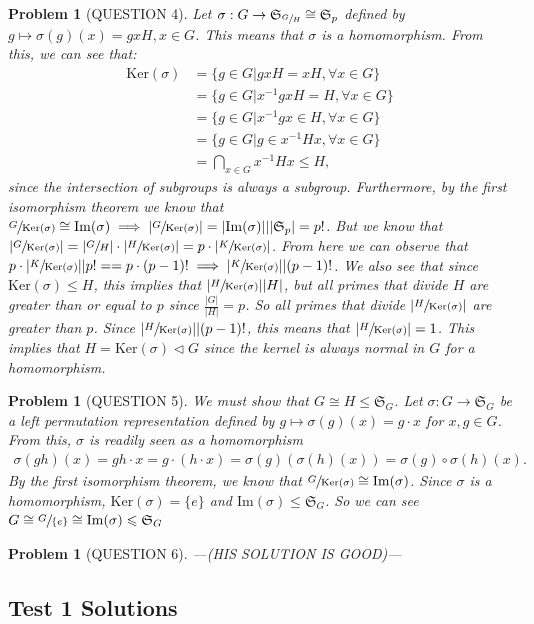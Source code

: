 \documentclass[titlepage]{article}
\theoremstyle{plain}
\newtheorem{problem}[theorem]{Problem}
\theoremstyle{definition}
\theoremstyle{remark}
\theoremstyle{exercise-style}
\numberwithin{equation}{section}
\numberwithin{theorem}{section}
\numberwithin{remark}{section}
\begin{document}
\begin{problem}[QUESTION 4]
    Let $\sigma : G \to \mathfrak{S}_{\sfrac{G}{H}} \cong \mathfrak{S}_p$ defined by $g \mapsto \sigma(g)(x) = gxH, x\in G$. This means that $\sigma$ is a homomorphism. From this, we can see that:
    \begin{align}
        \mathrm{Ker}(\sigma) &= \{ g \in G | gxH = xH, \forall x \in G \} \\
        &= \{ g \in G | x^{-1}gxH = H, \forall x \in G \} \\
        &= \{ g \in G | x^{-1}gx \in H, \forall x \in G \} \\
        &= \{ g \in G | g \in x^{-1}Hx, \forall x \in G \} \\
        &= \bigcap_{x \in G} x^{-1}H x \leqslant H,
    \end{align}
    since the intersection of subgroups is always a subgroup. Furthermore, by the first isomorphism theorem we know that $\sfrac{G}{\mathrm{Ker}(\sigma)} \cong \mathrm{Im}(\sigma) \implies |\sfrac{G}{\mathrm{Ker}(\sigma)}| = |\mathrm{Im}(\sigma)|||\mathfrak S_{p}| = p!$. But we know that $|\sfrac{G}{\mathrm{Ker}(\sigma)}|= |\sfrac{G}{H}|\cdot |\sfrac{H}{\mathrm{Ker}(\sigma)}| = p \cdot |\sfrac{K}{\mathrm{Ker}(\sigma)}|$. From here we can observe that $p \cdot |\sfrac{K}{\mathrm{Ker}(\sigma)}||p! == p \cdot (p-1)! \implies |\sfrac{K}{\mathrm{Ker}(\sigma)}| | (p-1)!$. We also see that since $\mathrm{Ker}(\sigma) \leqslant H$, this implies that $|\sfrac{H}{\mathrm{Ker}(\sigma)}||H|$, but all primes that divide $H$ are greater than or equal to $p$ since $\frac{|G|}{|H|}= p$. So all primes that divide $|\sfrac{H}{\mathrm{Ker}(\sigma)}|$ are greater than $p$. Since $|\sfrac{H}{\mathrm{Ker}(\sigma)}||(p-1)!$, this means that $|\sfrac{H}{\mathrm{Ker}(\sigma)}|=1$. This implies that $H = \mathrm{Ker}(\sigma) \triangleleft G$ since the kernel is always normal in $G$ for a homomorphism.
\end{problem}

\begin{problem}[QUESTION 5]
    We must show that $G \cong H \leqslant \mathfrak{S}_G$. Let $\sigma : G \to \mathfrak{S}_G$ be a left permutation representation defined by $g \mapsto \sigma(g)(x) = g \cdot x$ for $x, g \in G$. From this, $\sigma$ is readily seen as a homomorphism
    \begin{align}
        \sigma(gh)(x) = gh \cdot x = g \cdot (h \cdot x) = \sigma(g)(\sigma(h)(x)) = \sigma(g) \circ \sigma(h)(x).
    \end{align}
    By the first isomorphism theorem, we know that $\sfrac{G}{\mathrm{Ker}(\sigma)} \cong \mathrm{Im}(\sigma)$. Since $\sigma$ is a homomorphism, $\mathrm{Ker}(\sigma) = \{ e \}$ and $\mathrm{Im}(\sigma) \leqslant \mathfrak{S}_G$. So we can see $G \cong \sfrac{G}{\{e\}} \cong \mathrm{Im}(\sigma) \leqslant \mathfrak{S}_G$
\end{problem}

\begin{problem}[QUESTION 6]
    ---(HIS SOLUTION IS GOOD)---
\end{problem}

\subsection{Test 1 Solutions}


\end{document}
